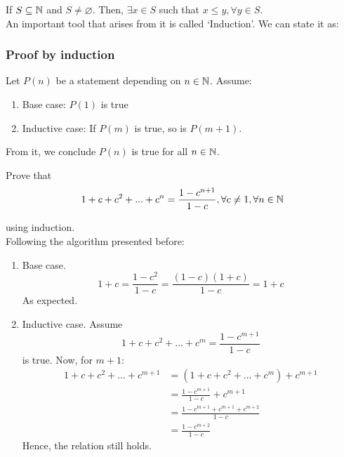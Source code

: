 If $S \subseteq \mathbb{N}$ and $S \neq \varnothing$. Then, $\exists x \in S$ such that $x \leq y, \forall y \in S$. \\

An important tool that arises from it is called `Induction'. We can state it as:

\subsubsection{Proof by induction}

Let $P(n)$ be a statement depending on $n \in \mathbb{N}$. Assume:

\begin{enumerate}
    \item Base case: $P(1)$ is true
    \item Inductive case: If $P(m)$ is true, so is $P(m+1)$.
\end{enumerate}

From it, we conclude $P(n)$ is true for all $n \in \mathbb{N}$.

\begin{eg}
    Prove that 
    \begin{equation*}
        1 + c + c^2 + ... + c^n = \frac{1-c^{n+1}}{1-c}, \forall c \neq 1, \forall n \in \mathbb{N}
    \end{equation*}
    
    using induction. \\
    
    Following the algorithm presented before:
    \begin{enumerate}
        \item Base case.
            \begin{equation*}
                1 + c = \frac{1-c^2}{1 - c} = \frac{(1-c)(1+c)}{1-c} = 1 + c
            \end{equation*}
            As expected.
        \item Inductive case.
            Assume
            \begin{equation*}
                1 + c + c^2 + ... + c^m = \frac{1-c^{m+1}}{1-c}
            \end{equation*}
            is true. Now, for $m+1$:
            \begin{equation*}
                \begin{split}
                    1 + c + c^2 + ... + c^{m+1} & = (1 + c + c^2 + ... +c^{m}) + c^{m+1} \\
                    & = \frac{1-c^{m+1}}{1-c} + c^{m+1} \\
                    & = \frac{1-c^{m+1} + c^{m+1} + c^{m+2}}{1-c} \\
                    & = \frac{1-c^{m+2}}{1-c}
                \end{split}
            \end{equation*}
            Hence, the relation still holds.
    \end{enumerate}
\end{eg}

